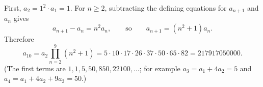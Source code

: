 First, $a_2=1^2\cdot a_1=1$. For $n\ge2$, subtracting the defining equations for $a_{n+1}$ and $a_n$ gives
\[a_{n+1}-a_n=n^2a_n,\qquad\text{so}\qquad a_{n+1}=\left(n^2+1\right)a_n.\]
Therefore
\[a_{10}=a_2\prod_{n=2}^{9}\left(n^2+1\right)=5\cdot10\cdot17\cdot26\cdot37\cdot50\cdot65\cdot82=\boxed{217917050000}.\]
(The first terms are $1,1,5,50,850,22100,\dots$; for example $a_3=a_1+4a_2=5$ and $a_4=a_1+4a_2+9a_3=50$.)
